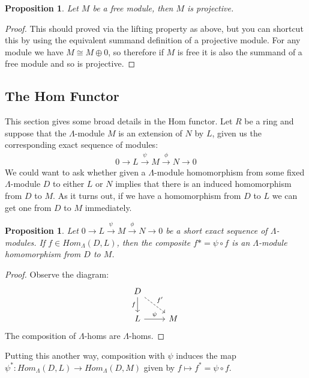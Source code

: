 \documentclass[12pt]{book}
\newtheorem{proposition}[theorem]{Proposition}
\theoremstyle{definition}
\begin{document}
\begin{proposition}
    Let $M$ be a free module, then $M$ is projective. 
\end{proposition}
\begin{proof}
    This should proved via the lifting property as above, but you can shortcut this by using the equivalent summand definition of a projective module. For any module we have $M \cong M \oplus 0$, so therefore if $M$ is free it is also the summand of a free module and so is projective. 
\end{proof}

\subsection{The Hom Functor}
This section gives some broad details in the Hom functor. Let $R$ be a ring and suppose that the $\Lambda$-module $M$ is an extension of $N$ by $L$, given us the corresponding exact sequence of modules: 
\begin{align*}
    0 \rightarrow L \xrightarrow{\psi} M \xrightarrow{\phi} N \rightarrow 0 
\end{align*}
We could want to ask whether given a $\Lambda$-module homomorphism from some fixed $\Lambda$-module $D$ to either $L$ or $N$ implies that there is an induced homomorphism from $D$ to $M$. As it turns out, if we have a homomorphism from $D$ to $L$ we can get one from $D$ to $M$ immediately. 

\begin{proposition}
    Let $0 \rightarrow L \xrightarrow{\psi} M \xrightarrow{\phi} N \rightarrow 0$ be a short exact sequence of $\Lambda$-modules. If $f \in Hom_\Lambda(D,L)$, then the composite $f* = \psi \circ f$ is an $\Lambda$-module homomorphism from $D$ to $M$. 
\end{proposition}

\begin{proof}
    Observe the diagram: 
    \[
    \begin{tikzcd}
    D \arrow[d, "f"'] \arrow[rd, "f'", dashed] &   \\
    L \arrow[r, "\psi"]                        & M
\end{tikzcd}
    \]
    The composition of $\Lambda$-homs are $\Lambda$-homs. 
\end{proof}

Putting this another way, composition with $\psi$ induces the map $\psi^* : Hom_\Lambda(D,L) \to Hom_\Lambda(D,M)$ given by $f \mapsto f^* = \psi \circ f$.\\
\end{document}
